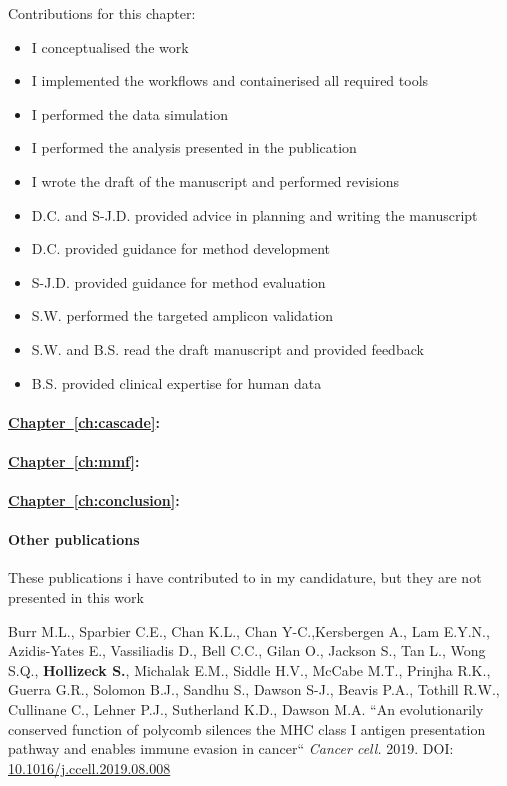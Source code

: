 {Contributions for this chapter:
\begin{itemize}
	\item I conceptualised the work
	\item I implemented the workflows and containerised all required tools
	\item I performed the data simulation
	\item I performed the analysis presented in the publication
	\item I wrote the draft of the manuscript and performed revisions
	\item D.C. and S-J.D. provided advice in planning and writing the manuscript
	\item D.C. provided guidance for method development
	\item S-J.D. provided guidance for method evaluation
	\item S.W. performed the targeted amplicon validation
	\item S.W. and  B.S. read the draft manuscript and provided feedback
	\item B.S. provided clinical expertise for human data
\end{itemize}



\paragraph{\hyperref[ch:cascade]{Chapter~\ref*{ch:cascade}}:} 


\paragraph{\hyperref[ch:mmf]{Chapter~\ref*{ch:mmf}}:}

\paragraph{\hyperref[ch:conclusion]{Chapter~\ref*{ch:conclusion}}:}


\paragraph{Other publications} These publications i have contributed to in my candidature, but they are not presented in this work

Burr M.L., Sparbier C.E., Chan K.L., Chan Y-C.,Kersbergen A., Lam E.Y.N., Azidis-Yates E., Vassiliadis D., Bell C.C., Gilan O., Jackson S., Tan L., Wong S.Q., \textbf{Hollizeck S.}, Michalak E.M., Siddle H.V.,  McCabe M.T., Prinjha R.K., Guerra G.R., Solomon B.J., Sandhu S.,  Dawson S-J., Beavis P.A., Tothill R.W., Cullinane C., Lehner P.J., Sutherland K.D., Dawson M.A. ``An evolutionarily conserved function of polycomb silences the MHC class I antigen presentation pathway and enables immune evasion in cancer`` \textit{Cancer cell.} 2019. DOI: \href{https://doi.org/10.1016/j.ccell.2019.08.008}{10.1016/j.ccell.2019.08.008}

}
